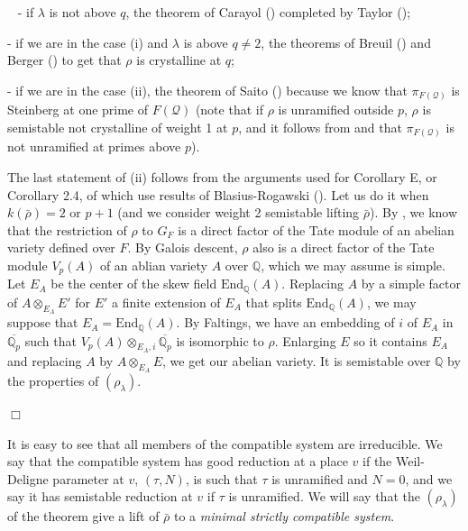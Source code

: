 \documentclass[12pt]{article}
\newcommand{\Q}{\mathbb{Q}}
\newcommand{\aQp}{\overline{\mathbb{Q}_{p}}}
\newcommand{\rhobar}{\overline{\rho}}
\newenvironment{proof}{\smallskip\noindent{\bf Proof.}\
}{$\Box$\smallskip\goodbreak}
\def\rhobar{ {\bar {\rho} } }
\def\rhob{ {\bar {\rho} } }
\begin{document}
\begin{proof}
- if $\lambda$ is not above $q$, the theorem of Carayol
(\cite{Carayol}) completed by Taylor (\cite{Tay});

- if we are in the case (i)  and $\lambda$ is above $q\not= 2$,
the theorems of Breuil (\cite{Breuil-cong}) and Berger
(\cite{Berger}) to get that $\rho$ is crystalline at $q$;

- if we are in the case (ii), the theorem of Saito (\cite{Saito})
because we know that $\pi_ { F(\mathcal{Q})}$ is Steinberg
at one prime of $F(\mathcal{Q})$
(note that if $\rho$ is unramified outside $p$, $\rho$ is semistable
not crystalline of  weight 1 at $p$, and it follows from
\cite{Breuil-cong} and  \cite{Berger} that  $\pi_ { F(\mathcal{Q})}$
is not unramified at primes above $p$).







The last statement
of (ii) follows from the arguments used for Corollary E, or Corollary
2.4, of
\cite{[T02]} which use results of Blasius-Rogawski (\cite{BR}). Let us do it when
$k(\rhobar)=2$ or $p+1$ (and we consider weight 2 semistable lifting
$\rhobar$). By \cite{BR}, we know that the restriction of $\rho$
to $G_F$ is a direct factor of the Tate module of an abelian variety
defined over $F$. By Galois descent, $\rho$ also is a direct factor
of the Tate module $V_p (A)$ of an ablian variety $A$ over $\Q$,
which we may assume is simple. Let $E_A$ be the center of the
skew field $\mathrm{End}_{\Q} (A)$.
Replacing $A$ by a simple factor of
 $A\otimes_{E_A} E'$ for $E'$ a finite extension
of $E_A$ that splits $\mathrm{End}_{\Q} (A)$, we may suppose that
 $E_A =\mathrm{End}_{\Q} (A)$.
 By Faltings, we have an embedding of $i$ of
$E_A$ in $\aQp$ such that $V_p (A)\otimes _{E_A ,i} \aQp$ is isomorphic
to $\rho$. Enlarging $E$ so it contains $E_A$ and  replacing
$A$ by $A\otimes_{E_A} E$, we get our abelian variety. It is
semistable over $\Q$ by the properties of $(\rho _{\lambda })$.

\end{proof}

It is easy to see that all members of the compatible system are
irreducible.
We say that the compatible system has good reduction at a place $v$ if
the Weil-Deligne parameter at $v$, $(\tau,N)$, is such that $\tau$ is
unramified and $N=0$, and we say it has semistable reduction at $v$ if
$\tau$ is
unramified. We will say that the $(\rho_{\lambda})$ of the theorem
give a lift of $\rhob$ to a {\it minimal strictly compatible system}.
\end{document}
